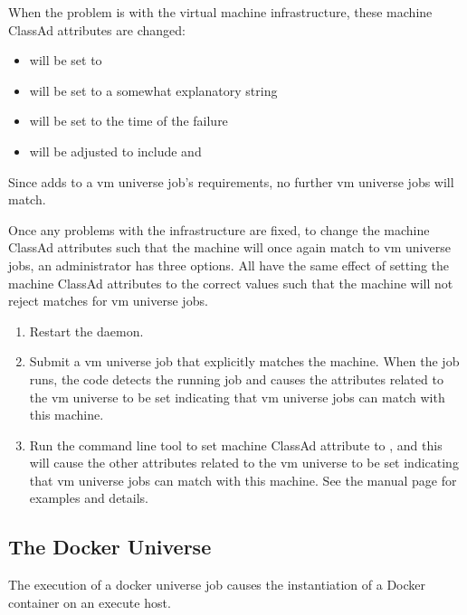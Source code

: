 When the problem is with the virtual machine infrastructure,
these machine ClassAd attributes are changed:
\begin{itemize}
\item {} will be set to 
\item {} will be set to a somewhat explanatory string
\item {} will be set to the time of the failure 
\item {} will be adjusted to include  
and 
\end{itemize}

Since 
adds  to a vm universe job's requirements,
no further 
vm universe jobs will match.

Once any problems with the infrastructure are fixed,
to change the machine ClassAd attributes such that the machine
will once again match to vm universe jobs,
an administrator has three options.  
All have the same effect
of setting the machine ClassAd attributes to the correct values
such that the machine will not reject matches for vm universe jobs.
\begin{enumerate}
\item  Restart the  daemon.
\item  Submit a vm universe job that explicitly matches the machine.
When the job runs, the code detects the running job and causes 
the attributes related to the vm universe to be set indicating 
that vm universe jobs can match with this machine.
\item  Run the command line tool 
to set machine ClassAd attribute  to ,
and this will cause the other attributes related to the vm universe 
to be set indicating that vm universe jobs can match with this machine.
See the  manual page for
examples and details.
\end{enumerate}

\subsection{\label{sec:docker-install}The Docker Universe}
The execution of a docker universe job causes the
instantiation of a Docker container on an execute host.

